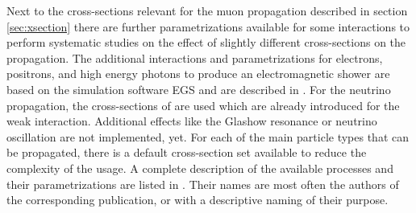 Next to the cross-sections relevant for the muon propagation described in section \ref{sec:xsection} there are further parametrizations available for some interactions to perform systematic studies on the effect of slightly different cross-sections on the propagation.
The additional interactions and parametrizations for electrons, positrons, and high energy photons to produce an electromagnetic shower are based on the simulation software EGS \cite{EGS5} and are described in \cite{Alameddine20Master}.
For the neutrino propagation, the cross-sections of \cite{CSMS11NuXsection} are used which are already introduced for the weak interaction.
Additional effects like the Glashow resonance or neutrino oscillation are not implemented, yet.
For each of the main particle types that can be propagated, there is a default cross-section set available to reduce the complexity of the usage.
A complete description of the available processes and their parametrizations are listed in .
Their names are most often the authors of the corresponding publication, or with a descriptive naming of their purpose.
